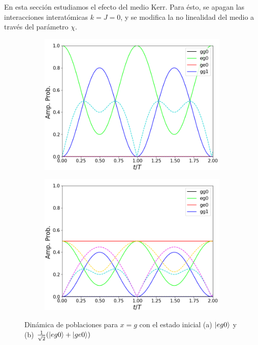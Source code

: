 En esta sección estudiamos el efecto del medio Kerr. Para ésto, se apagan las interacciones interatómicas $k=J=0$, y se modifica la no linealidad del medio a través del parámetro $\chi$. 
\begin{figure}[h]
    \centering
    \begin{subfigure}{0.49\textwidth}
        \includegraphics[width=\textwidth]{figuras/ch4/x eg0 abc.png}
        \caption{}
        \label{fig4:pob x eg0}
    \end{subfigure}
    \hfill
    \begin{subfigure}{0.49\textwidth}
        \includegraphics[width=\textwidth]{figuras/ch4/x eg0+ abc.png}
        \caption{}
        \label{fig4:pob x eg0 sim}
    \end{subfigure}
    \caption{Dinámica de poblaciones para $x=g$ con el estado inicial (a) $\ket{eg0}$ y (b) $\frac{1}{\sqrt{2}}(\ket{eg0}+\ket{ge0})$}
    \label{fig4:pob x}
\end{figure}

